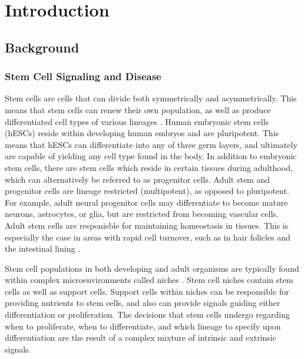 
\chapter{Introduction} %

\label{Chapter1} %



\section{Background}

\subsection{Stem Cell Signaling and Disease}

Stem cells are cells that can divide both symmetrically and asymmetrically. This means that stem cells can renew their own population, as well as produce differentiated cell types of various lineages \cite{Basics_2009}. Human embryonic stem cells (hESCs) reside within developing human embryos and are pluripotent. This means that hESCs can differentiate into any of three germ layers, and ultimately are capable of yielding any cell type found in the body. In addition to embryonic stem cells, there are stem cells which reside in certain tissues during adulthood, which can alternatively be referred to as progenitor cells. Adult stem and progenitor cells are lineage restricted (multipotent), as opposed to pluripotent. For example, adult neural progenitor cells may differentiate to become mature neurons, astrocytes, or glia, but are restricted from becoming vascular cells. Adult stem cells are responisble for maintaining homeostasis in tissues. This is especially the case in areas with rapid cell turnover, such as in hair folicles and the intestinal lining \cite{Potten_1998, Morris_2004}.

Stem cell populations in both developing and adult organisms are typically found within complex microenvironments called niches \cite{Scadden_2006}. Stem cell niches contain stem cells as well as support cells. Support cells within niches can be responsible for providing nutrients to stem cells, and also can provide signals guiding either differentiation or proliferation. The decisions that stem cells undergo regarding when to proliferate, when to differentiate, and which lineage to specify upon differentiation are the result of a complex mixture of intrinsic and extrinsic signals.

